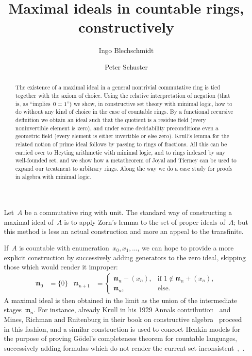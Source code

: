 \documentclass[envcountsect,envcountsame,runningheads]{llncs}
\newcommand{\mmm}{\mathfrak{m}}
\renewcommand{\_}{\mathpunct{.}\,}
\begin{document}
\title{Maximal ideals in countable rings, constructively}
\author{Ingo Blechschmidt \and Peter Schuster}

\maketitle

\begin{abstract}
  The existence of a maximal ideal in a general nontrivial commutative
  ring is tied together with the axiom of choice.
  Using the relative interpretation of
  negation (that is, as ``implies~$0=1$'') we show, in constructive set theory with
  minimal logic, how to do without any kind of choice in the case of countable rings. By a functional
  recursive definition we obtain an ideal such that the quotient is a residue field
  (every noninvertible element is zero), and under some decidability
  preconditions even a geometric field (every element is either invertible or
  else zero). Krull's lemma for the related notion of prime ideal follows by
  passing to rings of fractions. All this can be carried over to Heyting
  arithmetic with minimal logic, and to rings indexed by any well-founded set,
  and we show how a metatheorem of Joyal and Tierney can be used to expand our
  treatment to arbitrary rings. Along the way we do a case study for proofs in
  algebra with minimal logic.
\end{abstract}

Let~$A$ be a commutative ring with unit. The standard way of constructing a
maximal ideal of~$A$ is to apply Zorn's lemma to the set of proper ideals
of~$A$; but this method is less an actual construction and more an appeal to
the transfinite.

If~$A$ is countable with enumeration~$x_0,x_1,\ldots$, we can hope to provide a
more explicit construction by successively adding generators to the zero ideal,
skipping those which would render it improper:
\begin{align*}
  \mmm_0 &= \{ 0 \} &
  \mmm_{n+1} &= \begin{cases}
    \mmm_n + (x_n), & \text{if $1 \not\in \mmm_n + (x_n)$}, \\
    \mmm_n, & \text{else.}
  \end{cases}
\end{align*}
A maximal ideal is then obtained in the limit as the union of the intermediate
stages~$\mmm_n$. For instance, already Krull in his 1929 Annals contribution~\cite[Hilfssatz]{krull:ohne} and Mines, Richman and Ruitenburg in their book on constructive
algebra~\cite[Lemma~VI.3.2]{mines-richman-ruitenburg:constructive-algebra} proceed in this fashion,
and a similar
construction is used to concoct Henkin models for the purpose of proving
Gödel's completeness theorem for countable languages, successively adding
formulas which do not render the current set
inconsistent~\cite[Lemma~1.5.7]{dalen:logic},~\cite[Lemma~III.5.4]{simpson:subsystems}.
\end{document}
